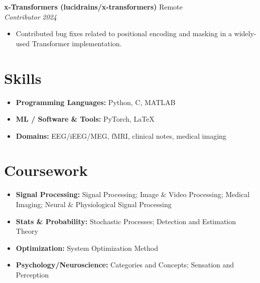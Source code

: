 \documentclass[11pt,a4paper]{article}
\newcommand{\cventry}[4]{%
  \noindent\textbf{#1} \hfill #2 \\
  \textit{#3} \hfill \textit{#4}
}
\begin{document}
\vspace{4pt}

\cventry{x-Transformers (lucidrains/x-transformers)}{Remote}{Contributor}{2024}
\begin{itemize}[leftmargin=*, itemsep=1pt, topsep=2pt]
  \item Contributed bug fixes related to positional encoding and masking in a widely-used Transformer implementation.
\end{itemize}

\section{Skills}

\vspace{4pt}

\begin{itemize}[leftmargin=*, itemsep=1pt]
  \item \textbf{Programming Languages:} Python, C, MATLAB
  \item \textbf{ML / Software \& Tools:} PyTorch, \LaTeX
  \item \textbf{Domains:} EEG/iEEG/MEG, fMRI, clinical notes, medical imaging
\end{itemize}

\section{Coursework}

\vspace{4pt}

\begin{itemize}[leftmargin=*, itemsep=1pt]
  \item \textbf{Signal Processing:} Signal Processing; Image \& Video Processing; Medical Imaging; Neural \& Physiological Signal Processing
  \item \textbf{Stats \& Probability:} Stochastic Processes; Detection and Estimation Theory
  \item \textbf{Optimization:} System Optimization Method
  \item \textbf{Psychology/Neuroscience:} Categories and Concepts; Sensation and Perception
\end{itemize}
\end{document}
